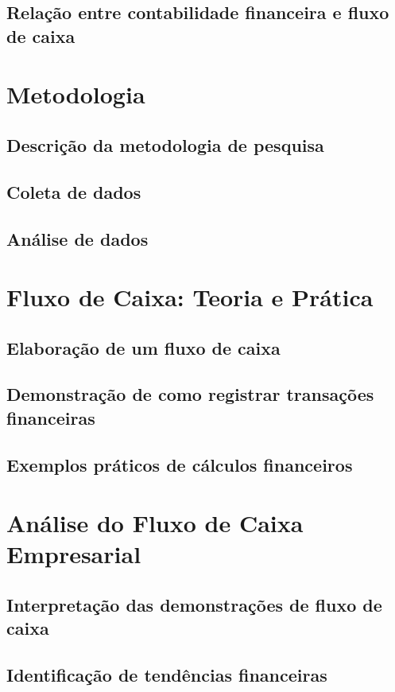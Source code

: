 \documentclass[a4paper,12pt]{article}
\begin{document}
\subsection{Relação entre contabilidade financeira e fluxo de caixa}

\section{Metodologia}

\subsection{Descrição da metodologia de pesquisa}
\subsection{Coleta de dados}
\subsection{Análise de dados}

\section{Fluxo de Caixa: Teoria e Prática}

\subsection{Elaboração de um fluxo de caixa}
\subsection{Demonstração de como registrar transações financeiras}
\subsection{Exemplos práticos de cálculos financeiros}

\section{Análise do Fluxo de Caixa Empresarial}

\subsection{Interpretação das demonstrações de fluxo de caixa}
\subsection{Identificação de tendências financeiras}
\end{document}
